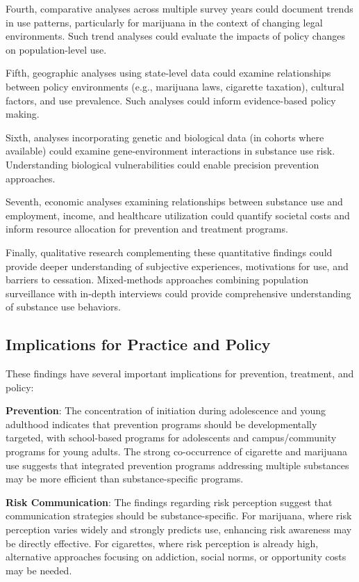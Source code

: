 \documentclass[conference]{IEEEtran}
\begin{document}
Fourth, comparative analyses across multiple survey years could document trends in use patterns, particularly for marijuana in the context of changing legal environments. Such trend analyses could evaluate the impacts of policy changes on population-level use.

Fifth, geographic analyses using state-level data could examine relationships between policy environments (e.g., marijuana laws, cigarette taxation), cultural factors, and use prevalence. Such analyses could inform evidence-based policy making.

Sixth, analyses incorporating genetic and biological data (in cohorts where available) could examine gene-environment interactions in substance use risk. Understanding biological vulnerabilities could enable precision prevention approaches.

Seventh, economic analyses examining relationships between substance use and employment, income, and healthcare utilization could quantify societal costs and inform resource allocation for prevention and treatment programs.

Finally, qualitative research complementing these quantitative findings could provide deeper understanding of subjective experiences, motivations for use, and barriers to cessation. Mixed-methods approaches combining population surveillance with in-depth interviews could provide comprehensive understanding of substance use behaviors.

\subsection{Implications for Practice and Policy}

These findings have several important implications for prevention, treatment, and policy:

\textbf{Prevention}: The concentration of initiation during adolescence and young adulthood indicates that prevention programs should be developmentally targeted, with school-based programs for adolescents and campus/community programs for young adults. The strong co-occurrence of cigarette and marijuana use suggests that integrated prevention programs addressing multiple substances may be more efficient than substance-specific programs.

\textbf{Risk Communication}: The findings regarding risk perception suggest that communication strategies should be substance-specific. For marijuana, where risk perception varies widely and strongly predicts use, enhancing risk awareness may be directly effective. For cigarettes, where risk perception is already high, alternative approaches focusing on addiction, social norms, or opportunity costs may be needed.
\end{document}
